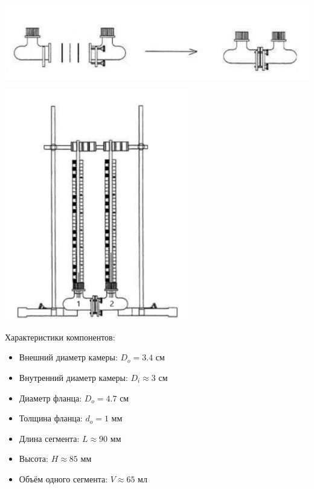 \documentclass{article}
\begin{document}
            \includegraphics[scale=0.65]{tools2.png} \\

            \begin{center}
                \includegraphics[scale=0.8]{tools3.png}
            \end{center}

            Характеристики компонентов:

            \begin{itemize}
                \item Внешний диаметр камеры: $D_o = 3.4$ см
                \item Внутренний диаметр камеры: $D_i \approx 3$ см
                \item Диаметр фланца: $D_o = 4.7$ см
                \item Толщина фланца: $d_o = 1$ мм
                \item Длина сегмента: $L \approx 90$ мм
                \item Высота: $H \approx 85$ мм
                \item Объём одного сегмента: $V \approx 65$ мл
            \end{itemize}
            \newpage
\end{document}
